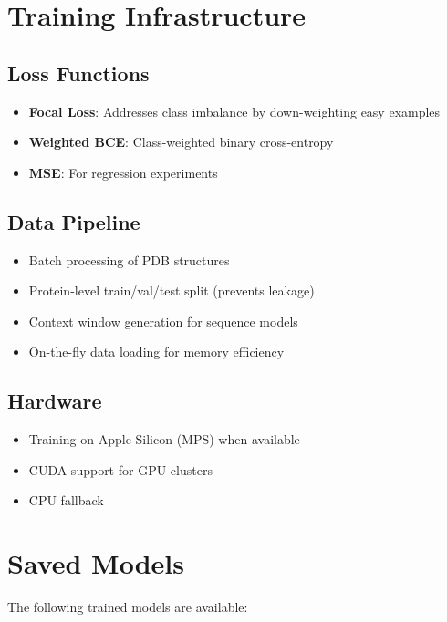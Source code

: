 \documentclass[11pt,a4paper]{article}
\begin{document}
\section{Training Infrastructure}

\subsection{Loss Functions}
\begin{itemize}
    \item \textbf{Focal Loss}: Addresses class imbalance by down-weighting easy examples
    \item \textbf{Weighted BCE}: Class-weighted binary cross-entropy
    \item \textbf{MSE}: For regression experiments
\end{itemize}

\subsection{Data Pipeline}
\begin{itemize}
    \item Batch processing of PDB structures
    \item Protein-level train/val/test split (prevents leakage)
    \item Context window generation for sequence models
    \item On-the-fly data loading for memory efficiency
\end{itemize}

\subsection{Hardware}
\begin{itemize}
    \item Training on Apple Silicon (MPS) when available
    \item CUDA support for GPU clusters
    \item CPU fallback
\end{itemize}

\section{Saved Models}

The following trained models are available:
\end{document}
